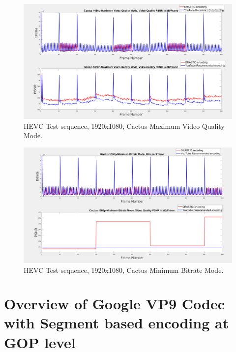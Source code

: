 \documentclass{book}
\begin{document}
\begin{figure}[hbt!]
	\centering
	\includegraphics[width=\linewidth]{pictures/ch4/Cactus_MaxQ.png}
	\caption{HEVC Test sequence, 1920x1080, Cactus Maximum Video Quality Mode.}
	\label{fig:Cactus_maxQ}
\end{figure}

\begin{figure}[hbt!]
	\centering
	\includegraphics[width=\linewidth]{pictures/ch4/Cactus_MinB.png}
	\caption{HEVC Test sequence, 1920x1080, Cactus Minimum Bitrate Mode.}
	\label{fig:Cactus_minBits}
\end{figure}


%
%
\chapter[Overview of Google VP9 Codec for VoD]{Overview of Google VP9 Codec with Segment based encoding at GOP level}
\end{document}
